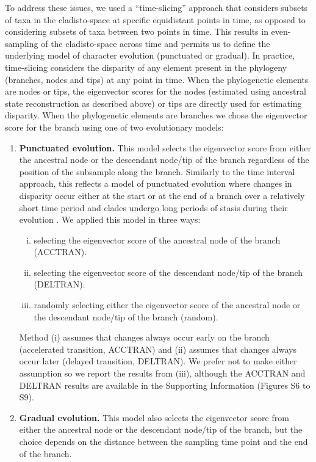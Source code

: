 \documentclass[10pt,letterpaper]{article}
\begin{document}
To address these issues, we used a ``time-slicing'' approach that considers subsets of taxa in the cladisto-space at specific equidistant points in time, as opposed to considering subsets of taxa between two points in time.
This results in even-sampling of the cladisto-space across time and permits us to define the underlying model of character evolution (punctuated or gradual).  
In practice, time-slicing considers the disparity of any element present in the phylogeny (branches, nodes and tips) at any point in time.
When the phylogenetic elements are nodes or tips, the eigenvector scores for the nodes (estimated using ancestral state reconstruction as described above) or tips are directly used for estimating disparity.
When the phylogenetic elements are branches we chose the eigenvector score for the branch using one of two evolutionary models:
\begin{enumerate}
    \item{\textbf{Punctuated evolution.}} 
    This model selects the eigenvector score from either the ancestral node or the descendant node/tip of the branch regardless of the position of the subsample along the branch. 
    Similarly to the time interval approach, this reflects a model of punctuated evolution where changes in disparity occur either at the start or at the end of a branch over a relatively short time period and clades undergo long periods of stasis during their evolution \cite{Gould1977,Hunt20112007}.
    We applied this model in three ways: 
    \begin{enumerate}[(i)]
      \item selecting the eigenvector score of the ancestral node of the branch (ACCTRAN).
      \item selecting the eigenvector score of the descendant node/tip of the branch (DELTRAN).
      \item randomly selecting either the eigenvector score of the ancestral node or the descendant node/tip of the branch (random).
    \end{enumerate}
    Method (i) assumes that changes always occur early on the branch (accelerated transition, ACCTRAN) and (ii) assumes that changes always occur later (delayed transition, DELTRAN).
    We prefer not to make either assumption so we report the results from (iii), although the ACCTRAN and DELTRAN results are available in the Supporting Information (Figures S6 to S9).
    \item{\textbf{Gradual evolution.}}
    This model also selects the eigenvector score from either the ancestral node or the descendant node/tip of the branch, but the choice depends on the distance between the sampling time point and the end of the branch.

\end{enumerate}
\end{document}
